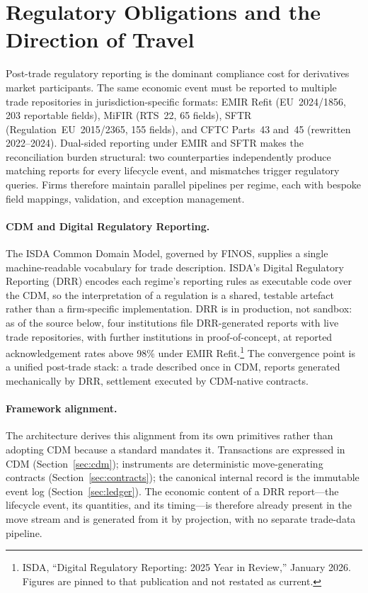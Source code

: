 \section{Regulatory Obligations and the Direction of Travel}
\label{sec:sec17}
\label{sec:regulatory}

Post-trade regulatory reporting is the dominant compliance cost for derivatives market participants. The same economic event must be reported to multiple trade repositories in jurisdiction-specific formats: EMIR Refit (EU~2024/1856, 203 reportable fields), MiFIR (RTS~22, 65 fields), SFTR (Regulation~EU~2015/2365, 155 fields), and CFTC Parts~43 and~45 (rewritten 2022--2024). Dual-sided reporting under EMIR and SFTR makes the reconciliation burden structural: two counterparties independently produce matching reports for every lifecycle event, and mismatches trigger regulatory queries. Firms therefore maintain parallel pipelines per regime, each with bespoke field mappings, validation, and exception management.

\paragraph{CDM and Digital Regulatory Reporting.}
The ISDA Common Domain Model, governed by FINOS, supplies a single machine-readable vocabulary for trade description. ISDA's Digital Regulatory Reporting (DRR) encodes each regime's reporting rules as executable code over the CDM, so the interpretation of a regulation is a shared, testable artefact rather than a firm-specific implementation. DRR is in production, not sandbox: as of the source below, four institutions file DRR-generated reports with live trade repositories, with further institutions in proof-of-concept, at reported acknowledgement rates above 98\% under EMIR Refit.\footnote{ISDA, ``Digital Regulatory Reporting: 2025 Year in Review,'' January 2026. Figures are pinned to that publication and not restated as current.} The convergence point is a unified post-trade stack: a trade described once in CDM, reports generated mechanically by DRR, settlement executed by CDM-native contracts.

\paragraph{Framework alignment.}
The architecture derives this alignment from its own primitives rather than adopting CDM because a standard mandates it. Transactions are expressed in CDM (Section~\ref{sec:cdm}); instruments are deterministic move-generating contracts (Section~\ref{sec:contracts}); the canonical internal record is the immutable event log (Section~\ref{sec:ledger}). The economic content of a DRR report---the lifecycle event, its quantities, and its timing---is therefore already present in the move stream and is generated from it by projection, with no separate trade-data pipeline.

